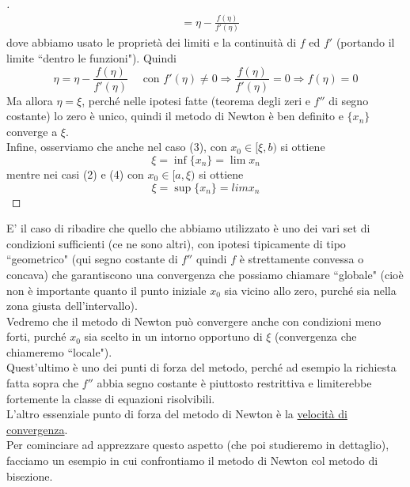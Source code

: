 \begin{proof}[\unskip\nopunct]
\[\begin{split}
	& = \eta - \frac{f(\eta)}{f'(\eta)}
\end{split} \]
dove abbiamo usato le proprietà dei limiti e la continuità di $f$ ed $f'$ (portando il limite ``dentro le funzioni"). Quindi 
\[ \eta=\eta-\frac{f(\eta)}{f'(\eta)} \quad \text{ con } f'(\eta) \neq 0 \Longrightarrow \frac{f(\eta)}{f'(\eta)} = 0 \Longrightarrow f(\eta)=0 \]
Ma allora $\eta=\xi$, perché nelle ipotesi fatte (teorema degli zeri e $f''$ di segno costante) lo zero è unico, quindi il metodo di Newton è ben definito e $\{x_n\}$ converge a $\xi$.\\
Infine, osserviamo che anche nel caso (3), con $x_0 \in [\xi,b)$ si ottiene \[\xi= \inf\{x_n\}=\lim x_n\] 
mentre nei casi (2) e (4) con $x_0 \in [a,\xi)$ si ottiene \[\xi= \sup \{x_n\}=lim x_n\] 
\end{proof}
E' il caso di ribadire che quello che abbiamo utilizzato è uno dei vari set di condizioni sufficienti (ce ne sono altri), con ipotesi tipicamente di tipo ``geometrico" (qui segno costante di $f''$ quindi $f$ è strettamente convessa o concava) che garantiscono una convergenza che possiamo chiamare ``globale" (cioè non è importante quanto il punto iniziale $x_0$ sia vicino allo zero, purché sia nella zona giusta dell'intervallo).\\
Vedremo che il metodo di Newton può convergere anche con condizioni meno forti, purché $x_0$ sia scelto in un intorno opportuno di $\xi$ (convergenza che chiameremo ``locale").\\
Quest'ultimo è uno dei punti di forza del metodo, perché ad esempio la richiesta fatta sopra che $f''$ abbia segno costante è piuttosto restrittiva e limiterebbe fortemente la classe di equazioni risolvibili.\\
L'altro essenziale punto di forza del metodo di Newton è la \uline{velocità di convergenza}.\\
Per cominciare ad apprezzare questo aspetto (che poi studieremo in dettaglio), facciamo un esempio in cui confrontiamo il metodo di Newton col metodo di bisezione.

